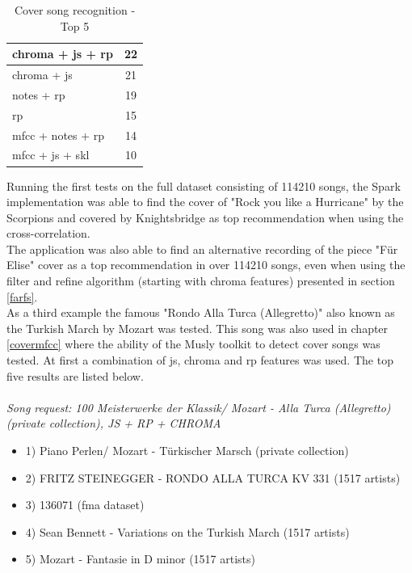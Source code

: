 \begin{table}[H]
\begin{minipage}{0.5\textwidth}
\begin{center}
\begin{tabular}{|l||c|}
				\hline
				chroma + js + rp & 22\\
				\hline
				chroma + js & 21\\
				\hline
				notes + rp & 19\\
				\hline
				rp & 15\\
				\hline
				mfcc + notes + rp & 14\\
				\hline
				mfcc + js + skl & 10\\
				\hline
			\end{tabular}
			\label{cov_2}
		\end{center}
		\caption{Cover song recognition - Top 5}
	\end{minipage}
\end{table}

\noindent Running the first tests on the full dataset consisting of 114210 songs, the Spark implementation was able to find the cover of "Rock you like a Hurricane" by the Scorpions and covered by Knightsbridge as top recommendation when using the cross-correlation.\\
\noindent The application was also able to find an alternative recording of the piece "Für Elise" cover as a top recommendation in over 114210 songs, even when using the filter and refine algorithm (starting with chroma features) presented in section \ref{farfs}.\\
\noindent As a third example the famous "Rondo Alla Turca (Allegretto)" also known as the Turkish March by Mozart was tested. This song was also used in chapter \ref{covermfcc} where the ability of the Musly toolkit to detect cover songs was tested. 
At first a combination of js, chroma and rp features was used. The top five results are listed below.\\
\ \\
\textit{\noindent Song request: 100 Meisterwerke der Klassik/ Mozart - Alla Turca (Allegretto) (private collection), JS + RP + CHROMA}

\begin{itemize}
	\setlength\itemsep{-0.5em}
	\item 1) Piano Perlen/ Mozart - Türkischer Marsch (private collection)
	\item 2) FRITZ STEINEGGER - RONDO ALLA TURCA KV 331 (1517 artists)
	\item 3) 136071 (fma dataset)
	\item 4) Sean Bennett - Variations on the Turkish March (1517 artists)
	\item 5) Mozart - Fantasie in D minor (1517 artists)
\end{itemize}


